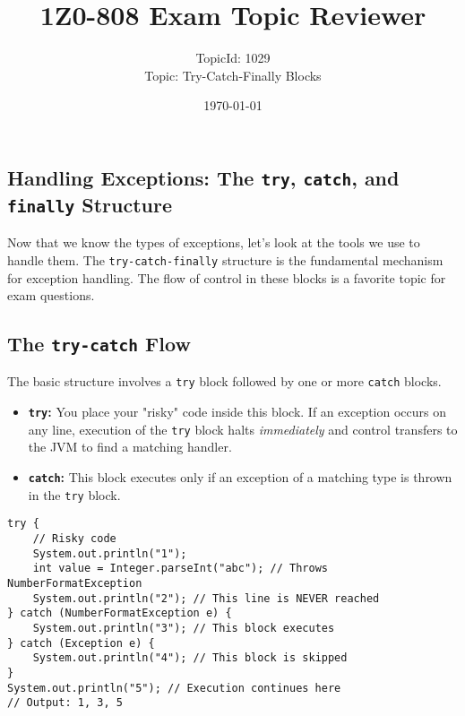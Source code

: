 \documentclass[12pt]{article}
\title{\textbf{1Z0-808 Exam Topic Reviewer}}
\author{TopicId: 1029 \\ Topic: Try-Catch-Finally Blocks}
\date{\today}
\begin{document}
\maketitle
\newpage\begin{enumerate}[label=(\arabic*)]
\section*{Handling Exceptions: The \texttt{try}, \texttt{catch}, and \texttt{finally} Structure}
Now that we know the types of exceptions, let's look at the tools we use to handle them. The \texttt{try-catch-finally} structure is the fundamental mechanism for exception handling. The flow of control in these blocks is a favorite topic for exam questions.

\subsection{The \texttt{try-catch} Flow}
The basic structure involves a \texttt{try} block followed by one or more \texttt{catch} blocks.
\begin{itemize}
    \item \textbf{\texttt{try}:} You place your "risky" code inside this block. If an exception occurs on any line, execution of the \texttt{try} block halts \textit{immediately} and control transfers to the JVM to find a matching handler.
    \item \textbf{\texttt{catch}:} This block executes only if an exception of a matching type is thrown in the \texttt{try} block. 
\end{itemize}
\begin{verbatim}
try {
    // Risky code
    System.out.println("1");
    int value = Integer.parseInt("abc"); // Throws NumberFormatException
    System.out.println("2"); // This line is NEVER reached
} catch (NumberFormatException e) {
    System.out.println("3"); // This block executes
} catch (Exception e) {
    System.out.println("4"); // This block is skipped
}
System.out.println("5"); // Execution continues here
// Output: 1, 3, 5
\end{verbatim}


\end{enumerate}
\end{document}
